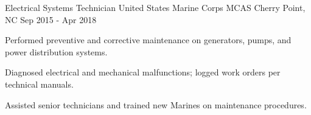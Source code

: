\begin{cventries}
  \cventry
    {Electrical Systems Technician} %
    {United States Marine Corps} %
    {MCAS Cherry Point, NC} %
    {Sep 2015 - Apr 2018} %
    {
      \begin{cvitems}
        \item {Performed preventive and corrective maintenance on generators, pumps, and power distribution systems.}
        \item {Diagnosed electrical and mechanical malfunctions; logged work orders per technical manuals.}
        \item {Assisted senior technicians and trained new Marines on maintenance procedures.}
      \end{cvitems}
    }

\end{cventries}